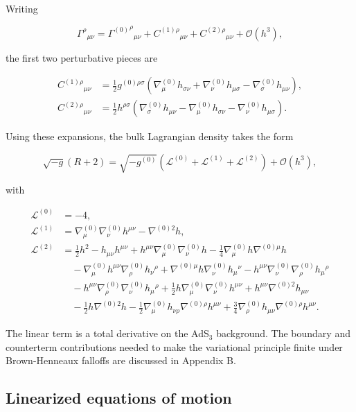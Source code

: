 Writing

\[
\Gamma^\rho{}_{\mu\nu}={\Gamma^{(0)}}^\rho{}_{\mu\nu}+C^{(1)\rho}{}_{\mu\nu}+C^{(2)\rho}{}_{\mu\nu}+\mathcal{O}(h^3),
\]

the first two perturbative pieces are

\begin{align}
C^{(1)\rho}{}_{\mu\nu}&=\frac{1}{2}g^{(0)\rho\sigma}\left(\nabla^{(0)}_\mu h_{\sigma\nu}+\nabla^{(0)}_\nu h_{\mu\sigma}-\nabla^{(0)}_\sigma h_{\mu\nu}\right),\\
C^{(2)\rho}{}_{\mu\nu}&=\frac{1}{2}h^{\rho\sigma}\left(\nabla^{(0)}_\sigma h_{\mu\nu}-\nabla^{(0)}_\mu h_{\sigma\nu}-\nabla^{(0)}_\nu h_{\mu\sigma}\right).
\end{align}

Using these expansions, the bulk Lagrangian density takes the form

\[
\sqrt{-g}(R+2)=\sqrt{-g^{(0)}}\left(\mathcal{L}^{(0)}+\mathcal{L}^{(1)}+\mathcal{L}^{(2)}\right)+\mathcal{O}(h^3),
\]

with

\begin{align}
\mathcal{L}^{(0)}&=-4,\\
\mathcal{L}^{(1)}&=\nabla^{(0)}_\mu\nabla^{(0)}_\nu h^{\mu\nu}-\nabla^{(0)2}h,\\
\mathcal{L}^{(2)}&=\frac{1}{2}h^2-h_{\mu\nu}h^{\mu\nu}+h^{\mu\nu}\nabla^{(0)}_\mu\nabla^{(0)}_\nu h-\frac{1}{4}\nabla^{(0)}_\mu h\nabla^{(0)\mu}h\\
&\quad-\nabla^{(0)}_\mu h^{\mu\nu}\nabla^{(0)}_\rho h_\nu{}^\rho+\nabla^{(0)\mu}h\nabla^{(0)}_\nu h_\mu{}^\nu-h^{\mu\nu}\nabla^{(0)}_\nu\nabla^{(0)}_\rho h_\mu{}^\rho\\
&\quad-h^{\mu\nu}\nabla^{(0)}_\rho\nabla^{(0)}_\nu h_\mu{}^\rho+\frac{1}{2}h\nabla^{(0)}_\mu\nabla^{(0)}_\nu h^{\mu\nu}+h^{\mu\nu}\nabla^{(0)2}h_{\mu\nu}\\
&\quad-\frac{1}{2}h\nabla^{(0)2}h-\frac{1}{2}\nabla^{(0)}_\mu h_{\nu\rho}\nabla^{(0)\rho}h^{\mu\nu}+\frac{3}{4}\nabla^{(0)}_\rho h_{\mu\nu}\nabla^{(0)\rho}h^{\mu\nu}.
\end{align}

The linear term is a total derivative on the AdS\(_3\) background. The boundary and counterterm contributions needed to make the variational principle finite under Brown-Henneaux falloffs are discussed in Appendix B.

\subsection{Linearized equations of motion}\label{linearized-equations-of-motion}

